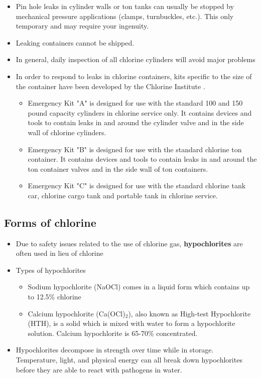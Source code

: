 \begin{itemize}
	\item Pin hole leaks in cylinder walls or ton tanks can usually be stopped by mechanical pressure applications (clamps, turnbuckles, etc.). This only temporary and may require your ingenuity.
	\item Leaking containers cannot be shipped.
	\item In general, daily inspection of all chlorine cylinders will avoid major problems\\
	\item In order to respond to leaks in chlorine containers, kits specific to the size of the container have been developed by the Chlorine Institute .
	\begin{itemize}
	\item Emergency Kit "A" is designed for use with the standard 100 and 150 pound capacity cylinders in chlorine service only. It contains devices and tools to contain leaks in and around the cylinder valve and in the side wall of chlorine cylinders.

\item Emergency Kit "B" is designed for use with the standard chlorine ton container. It contains devices and tools to contain leaks in and around the ton container valves and in the side wall of ton containers.

\item Emergency Kit "C" is designed for use with the standard chlorine tank car, chlorine cargo tank and portable tank in chlorine service.
	\end{itemize}
	
\end{itemize}

\subsection{Forms of chlorine}

\begin{itemize}
	\item Due to safety issues related to the use of chlorine gas, \textbf{hypochlorites} are often used in lieu of chlorine
	\item Types of hypochlorites
	\begin{itemize}
	\item Sodium hypochlorite (NaOCl) comes in a liquid form which contains up to 12.5\% chlorine 
	\item Calcium hypochlorite (Ca(OCl)$_2$), also known as High-test Hypochlorite (HTH), is a solid which is mixed with water to form a hypochlorite solution. Calcium hypochlorite is 65-70\% concentrated.
	\end{itemize}
	\item Hypochlorites decompose in strength over time while in storage. Temperature, light, and physical energy can all break down hypochlorites before they are able to react with pathogens in water. 

\end{itemize} 


